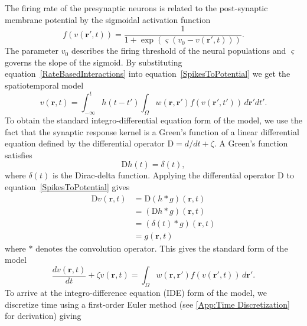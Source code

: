 \documentclass[review,authoryear,3p]{elsarticle}
\begin{document}
The firing rate of the presynaptic neurons is related to the post-synaptic membrane potential by the sigmoidal activation function 
\begin{equation}
	\label{ActivationFunction} f\left( v\left( \mathbf{r}', t \right) \right) = \frac{1}{1 + \exp \left( \varsigma \left( v_0 - v\left(\mathbf{r}',t\right) \right) \right)}. 
\end{equation}
The parameter $v_0$ describes the firing threshold of the neural populations and $\varsigma$ governs the slope of the sigmoid. By substituting equation~\ref{RateBasedInteractions} into equation~\ref{SpikesToPotential} we get the spatiotemporal model 
\begin{equation}
	\label{FullDoubleIntModel} v\left(\mathbf{r},t\right) =
	\int_{-\infty}^t 
	h\left(t - t'\right) \int_\Omega
	w\left(\mathbf{r},\mathbf{r}'\right) 
	f\left( v\left( \mathbf{r}',t' \right)\right)
	\, d\mathbf{r}'dt'.
\end{equation}
To obtain the standard integro-differential equation form of the model, we use the fact that the synaptic response kernel is a Green's function of a linear differential equation defined by the differential operator $\textrm{D}=d/dt + \zeta$. A Green's function satisfies
\begin{equation}
	\label{GreensFuncDef} \textrm{D}h\left( t \right) = \delta \left( t \right), 
\end{equation} 
where $\delta(t)$ is the Dirac-delta function. Applying the differential operator $\textrm{D}$ to equation~\ref{SpikesToPotential} gives
\begin{align}
 \textrm{D}v\left(\mathbf r,t\right)&= \textrm{D}\left(h\ast g\right)\left(\mathbf r,t\right)\\
&=\left(\textrm{D}h\ast g\right)\left(\mathbf r,t\right)\\
&=\left(\delta \left(t\right)\ast g\right)\left(\mathbf r,t\right)\\
&=g\left(\mathbf r,t\right)
\end{align}
where $\ast$ denotes the convolution operator. This gives the standard form of the model
\begin{equation}
	\label{FinalFormContinuous} 
	\frac{dv\left( \mathbf{r},t \right)}{dt} + \zeta v\left( \mathbf{r},t \right) = \int_\Omega {w\left( \mathbf{r},\mathbf{r}' \right)f\left( {v\left( \mathbf{r}',t \right)} \right)\, d\mathbf{r}'}. 
\end{equation}
To arrive at the integro-difference equation (IDE) form of the model, we discretize time using a first-order Euler method (see \ref{App:Time Discretization} for derivation) giving 
\end{document}
